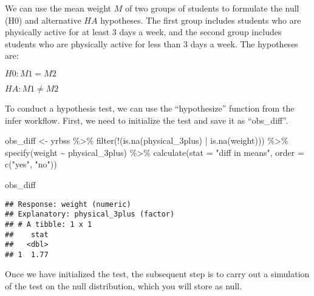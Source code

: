 \documentclass[
]{article}
\newenvironment{Shaded}{\begin{snugshade}}{\end{snugshade}}
\newcommand{\AttributeTok}[1]{\textcolor[rgb]{0.77,0.63,0.00}{#1}}
\newcommand{\FunctionTok}[1]{\textcolor[rgb]{0.00,0.00,0.00}{#1}}
\newcommand{\NormalTok}[1]{#1}
\newcommand{\OtherTok}[1]{\textcolor[rgb]{0.56,0.35,0.01}{#1}}
\newcommand{\SpecialCharTok}[1]{\textcolor[rgb]{0.00,0.00,0.00}{#1}}
\newcommand{\StringTok}[1]{\textcolor[rgb]{0.31,0.60,0.02}{#1}}
\begin{document}
We can use the mean weight \(M\) of two groups of students to formulate
the null (H0) and alternative \(HA\) hypotheses. The first group
includes students who are physically active for at least 3 days a week,
and the second group includes students who are physically active for
less than 3 days a week. The hypotheses are:

\(H0: M1 = M2\)

\(HA: M1 ≠ M2\)

To conduct a hypothesis test, we can use the ``hypothesize'' function
from the infer workflow. First, we need to initialize the test and save
it as ``obs\_diff''.

\begin{Shaded}
\begin{Highlighting}[]
\NormalTok{obs\_diff }\OtherTok{\textless{}{-}}\NormalTok{ yrbss }\SpecialCharTok{\%\textgreater{}\%}
  \FunctionTok{filter}\NormalTok{(}\SpecialCharTok{!}\NormalTok{(}\FunctionTok{is.na}\NormalTok{(physical\_3plus) }\SpecialCharTok{|} \FunctionTok{is.na}\NormalTok{(weight))) }\SpecialCharTok{\%\textgreater{}\%}
  \FunctionTok{specify}\NormalTok{(weight }\SpecialCharTok{\textasciitilde{}}\NormalTok{ physical\_3plus) }\SpecialCharTok{\%\textgreater{}\%}
  \FunctionTok{calculate}\NormalTok{(}\AttributeTok{stat =} \StringTok{"diff in means"}\NormalTok{, }\AttributeTok{order =} \FunctionTok{c}\NormalTok{(}\StringTok{"yes"}\NormalTok{, }\StringTok{"no"}\NormalTok{))}

\NormalTok{obs\_diff}
\end{Highlighting}
\end{Shaded}

\begin{verbatim}
## Response: weight (numeric)
## Explanatory: physical_3plus (factor)
## # A tibble: 1 x 1
##    stat
##   <dbl>
## 1  1.77
\end{verbatim}

Once we have initialized the test, the subsequent step is to carry out a
simulation of the test on the null distribution, which you will store as
null.
\end{document}
